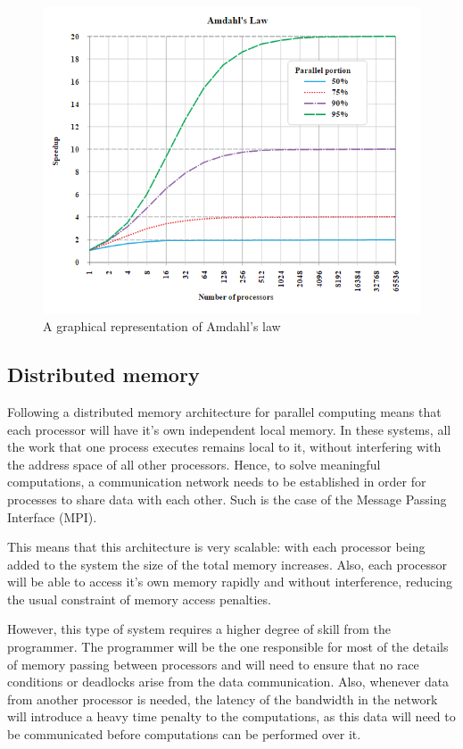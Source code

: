 \documentclass[12pt, openany]{book}
\begin{document}
\begin{figure}[H]
\centering
  \includegraphics[width=0.6\linewidth]{Resources/Images/amdahl.png}
  \caption{A graphical representation of Amdahl's law}
  \label{fig:amdahl}
\end{figure}

\subsection{Distributed memory}
Following a distributed memory architecture for parallel computing means that each processor will have it's own independent local memory. In these systems, all the work that one process executes remains local to it, without interfering with the address space of all other processors. Hence, to solve meaningful computations, a communication network needs to be established in order for processes to share data with each other. Such is the case of the Message Passing Interface (MPI).\par
This means that this architecture is very scalable: with each processor being added to the system the size of the total memory increases. Also, each processor will be able to access it's own memory rapidly and without interference, reducing the usual constraint of memory access penalties.
\par However, this type of system requires a higher degree of skill from the programmer. The programmer will be the one responsible for most of the details of memory passing between processors and will need to ensure that no race conditions or deadlocks arise from the data communication. Also, whenever data from another processor is needed, the latency of the bandwidth in the network will introduce a heavy time penalty to the computations, as this data will need to be communicated before computations can be performed over it.
\end{document}
